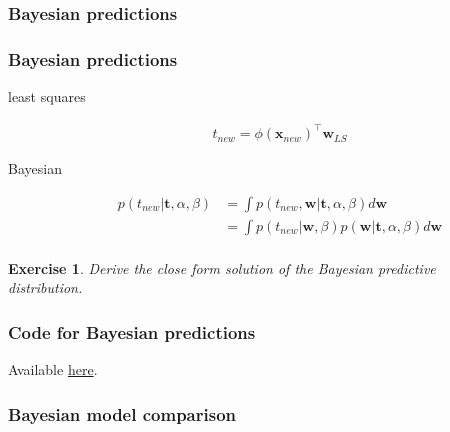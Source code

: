 \documentclass[11pt]{beamer}
\newtheorem{probExercise}{Exercise}
\begin{document}
\subsubsection{Bayesian predictions}

\begin{frame}
    \frametitle{Bayesian predictions}

    \scriptsize
    \begin{description}
        \item[least squares]
            \begin{align*}
                t_{new}=\phi(\mathbf{x}_{new})^\intercal\mathbf{w}_{LS}
            \end{align*}
        \item[Bayesian]
            \begin{align*}
                p(t_{new}|\mathbf{t},\alpha,\beta)&=\int p(t_{new},\mathbf{w}|\mathbf{t},\alpha,\beta)d\mathbf{w}\\
                                                  &=\int p(t_{new}|\mathbf{w},\beta)p(\mathbf{w}|\mathbf{t},\alpha,\beta)d\mathbf{w}\\
            \end{align*}
    \end{description}
    \begin{probExercise}
        Derive the close form solution of the Bayesian predictive distribution.
    \end{probExercise}
    \normalsize
\end{frame}

\begin{frame}
    \frametitle{Code for Bayesian predictions}

    Available \href{https://joacorapela.github.io/gcnuBridging2023/auto\_examples/bayesianLinearRegression/plotPredictiveDistribution.html\#sphx-glr-auto-examples-bayesianlinearregression-plotpredictivedistribution-py}{here}.

\end{frame}

\subsubsection{Bayesian model comparison}
\end{document}
